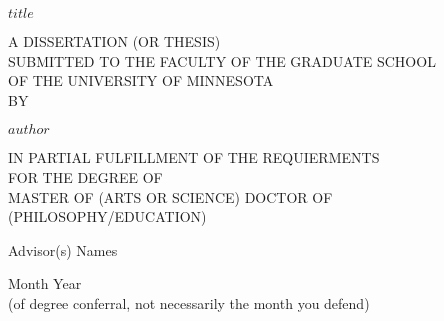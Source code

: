 %
%
%
% 

\begin{center}
     \vspace*{1cm}
         
     \Huge
     \textbf{$title$}
         
     \vspace{1.5cm}
     \vfill
     \large
     A DISSERTATION (OR THESIS)\\
     SUBMITTED TO THE FACULTY OF THE GRADUATE SCHOOL\\
     OF THE UNIVERSITY OF MINNESOTA\\
     BY
         
     \textbf{$author$}
     
     \vfill
     
     IN PARTIAL FULFILLMENT OF THE REQUIERMENTS\\
     FOR THE DEGREE OF\\
     MASTER OF (ARTS OR SCIENCE) DOCTOR OF (PHILOSOPHY/EDUCATION)
         
     \vfill
         
     \vspace{0.8cm}
         
     \Large
     Advisor(s) Names
     
     \vspace{0.8cm}
     
     Month Year\\ 
     (of degree conferral, not necessarily the month you defend) 
 \end{center}

 
 